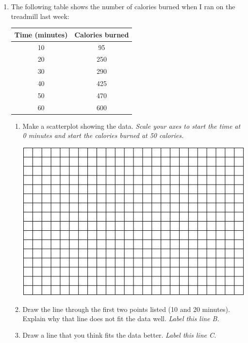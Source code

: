 \documentclass[12pt]{article}
\begin{document}
\begin{enumerate}
\newpage

\item The following table shows the number of calories burned when I ran on the treadmill last week:

\begin{center}
\begin{tabular} { |  c | c |} \hline
Time (minutes) & Calories burned \\ \hline \hline
 10 & 95  \\ \hline
 20 & 250  \\ \hline
 30 & 290 \\ \hline
 40 & 425 \\  \hline
 50 & 470 \\ \hline
 60 & 600 \\ \hline
\end{tabular}
\end{center}

\begin{enumerate}
\item Make a scatterplot showing the data.  \emph{Scale your axes to start the time at 0 minutes and start the calories burned at 50 calories.}
\vfill
\begin{center}
 {\includegraphics [width = 6in] {../GraphPaper}}
\end{center}
\vfill

\item  Draw the line through the first two points listed (10 and 20 minutes).  Explain why that line does not fit the data well.  \emph{Label this line B.}
\vfill
\vfill
\vfill
\item  Draw a line that you think fits the data better.  \emph{Label this line C.}
\end{enumerate}


\end{enumerate}
\end{document}
